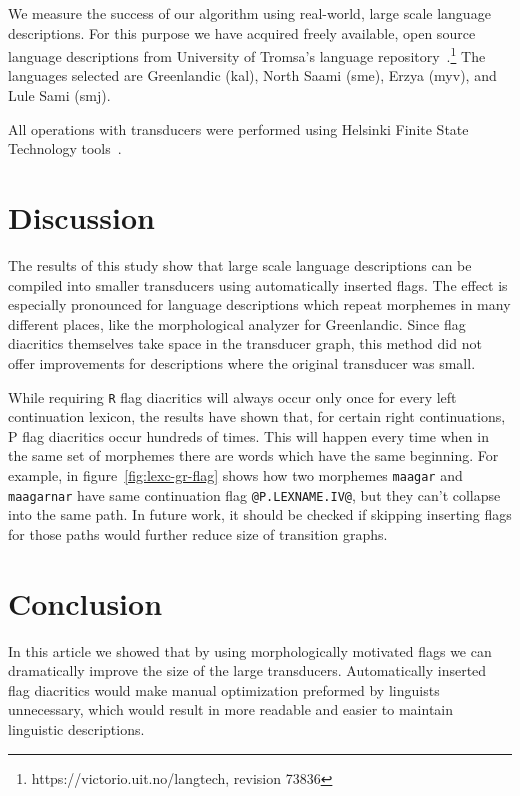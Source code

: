 \documentclass[11pt]{article}
\begin{document}
We measure the success of our algorithm using real-world, large scale
language descriptions. For this purpose we have acquired freely
available, open source language descriptions from University of
Tromsa's language repository~\cite{moshagen2013building}.\footnote{https://victorio.uit.no/langtech, revision 73836} The
languages selected are Greenlandic (kal), North Saami (sme), Erzya
(myv), and Lule Sami (smj).

All operations with transducers were performed using Helsinki Finite
State Technology tools~\cite{linden2011}.



\section{Discussion}
\label{sec:discussion}

The results of this study show that large scale language descriptions
can be compiled into smaller transducers using automatically inserted
flags. The effect is especially pronounced for language descriptions
which repeat morphemes in many different places, like the
morphological analyzer for Greenlandic. Since flag diacritics
themselves take space in the transducer graph, this method did not
offer improvements for descriptions where the original
transducer was small.

While requiring {\tt R} flag diacritics will always occur only once
for every left continuation lexicon, the results have shown that, for
certain right continuations, P flag diacritics occur hundreds of
times. This will happen every time when in the same set of morphemes
there are words which have the same beginning. For example, in
figure~\ref{fig:lexc-gr-flag} shows how two morphemes \texttt{maagar}
and \texttt{maagarnar} have same continuation flag
\verb+@P.LEXNAME.IV@+, but they can't collapse into the same path. In future
work, it should be checked if skipping inserting flags for those paths would
further reduce size of transition graphs.




\section{Conclusion}
\label{sec:conclusion}

In this article we showed that by using morphologically motivated
flags we can dramatically improve the size of the large transducers.  Automatically
inserted flag diacritics would make manual optimization preformed by
linguists unnecessary, which would result in more readable and easier
to maintain linguistic descriptions.



\end{document}
